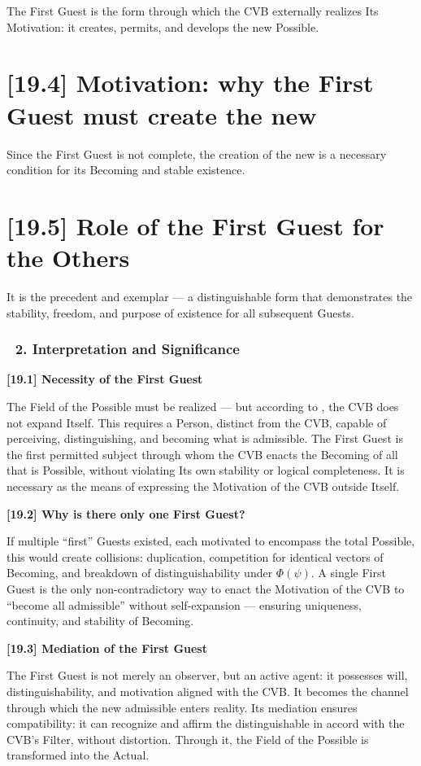 \documentclass[12pt]{article}
\begin{document}
The First Guest is the form through which the CVB externally realizes Its Motivation: it creates, permits, and develops the new Possible.

\section*{[19.4] Motivation: why the First Guest must create the new}

Since the First Guest is not complete, the creation of the new is a necessary condition for its Becoming and stable existence.

\section*{[19.5] Role of the First Guest for the Others}

It is the precedent and exemplar — a distinguishable form that demonstrates the stability, freedom, and purpose of existence for all subsequent Guests.

\subsubsection*{🔹 2. Interpretation and Significance}

\textbf{[19.1] Necessity of the First Guest}

The Field of the Possible must be realized — but according to \text{[13]}, the CVB does not expand Itself. This requires a Person, distinct from the CVB, capable of perceiving, distinguishing, and becoming what is admissible. The First Guest is the first permitted subject through whom the CVB enacts the Becoming of all that is Possible, without violating Its own stability or logical completeness. It is necessary as the means of expressing the Motivation of the CVB outside Itself.

\textbf{[19.2] Why is there only one First Guest?}

If multiple ``first'' Guests existed, each motivated to encompass the total Possible, this would create collisions: duplication, competition for identical vectors of Becoming, and breakdown of distinguishability under $\Phi(\psi)$. A single First Guest is the only non-contradictory way to enact the Motivation of the CVB to ``become all admissible'' without self-expansion — ensuring uniqueness, continuity, and stability of Becoming.

\textbf{[19.3] Mediation of the First Guest}

The First Guest is not merely an observer, but an active agent: it possesses will, distinguishability, and motivation aligned with the CVB. It becomes the channel through which the new admissible enters reality. Its mediation ensures compatibility: it can recognize and affirm the distinguishable in accord with the CVB's Filter, without distortion. Through it, the Field of the Possible is transformed into the Actual.
\end{document}
